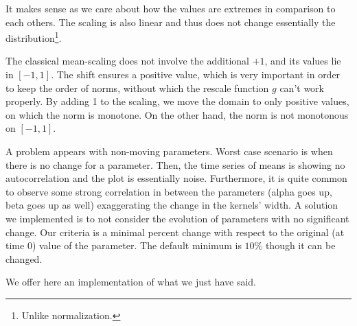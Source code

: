It makes sense as we care about how the values are extremes in comparison to each others. The scaling is also linear and thus does not change essentially the distribution\footnote{Unlike normalization.}. 

The classical mean-scaling does not involve the additional $+1$, and its values lie in $[-1,1]$. The shift ensures a positive value, which is very important in order to keep the order of norms, without which the rescale function $g$ can't work properly. By adding 1 to the scaling, we move the domain to only positive values, on which the norm is monotone. On the other hand, the norm is not monotonous on $[-1,1]$. 


A problem appears with non-moving parameters. Worst case scenario is when there is no change for a parameter. Then, the time series of means is showing no autocorrelation and the plot is essentially noise. Furthermore, it is quite common to observe some strong correlation in between the parameters (alpha goes up, beta goes up as well) exaggerating the change in the kernels' width. A solution we implemented is to not consider the evolution of parameters with no significant change. Our criteria is a minimal percent change with respect to the original (at time 0) value of the parameter. The default minimum is $10\%$ though it can be changed.


We offer here an implementation of what we just have said. 

